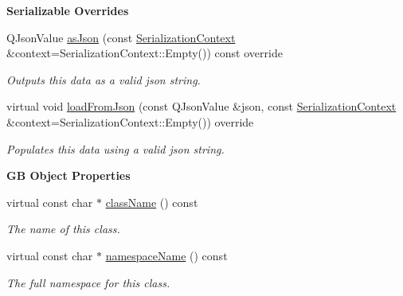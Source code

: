 \begin{Indent}\textbf{ Serializable Overrides}\par
\begin{DoxyCompactItemize}
\item 
\mbox{\label{classrev_1_1_material_af5b9c213b19fdae0e9d5223988ddbd7a}} 
Q\+Json\+Value \mbox{\hyperlink{classrev_1_1_material_af5b9c213b19fdae0e9d5223988ddbd7a}{as\+Json}} (const \mbox{\hyperlink{structrev_1_1_serialization_context}{Serialization\+Context}} \&context=Serialization\+Context\+::\+Empty()) const override
\begin{DoxyCompactList}\small\item\em Outputs this data as a valid json string. \end{DoxyCompactList}\item 
\mbox{\label{classrev_1_1_material_a23d4b7c07e8bc9f099489be893adf923}} 
virtual void \mbox{\hyperlink{classrev_1_1_material_a23d4b7c07e8bc9f099489be893adf923}{load\+From\+Json}} (const Q\+Json\+Value \&json, const \mbox{\hyperlink{structrev_1_1_serialization_context}{Serialization\+Context}} \&context=Serialization\+Context\+::\+Empty()) override
\begin{DoxyCompactList}\small\item\em Populates this data using a valid json string. \end{DoxyCompactList}\end{DoxyCompactItemize}
\end{Indent}
\begin{Indent}\textbf{ GB Object Properties}\par
\begin{DoxyCompactItemize}
\item 
virtual const char $\ast$ \mbox{\hyperlink{classrev_1_1_material_a353022875d44b057bf6de6c3c95fd5b9}{class\+Name}} () const
\begin{DoxyCompactList}\small\item\em The name of this class. \end{DoxyCompactList}\item 
virtual const char $\ast$ \mbox{\hyperlink{classrev_1_1_material_abfa4020a52b5d7c82cc285f58a1fb0c5}{namespace\+Name}} () const
\begin{DoxyCompactList}\small\item\em The full namespace for this class. \end{DoxyCompactList}\end{DoxyCompactItemize}
\end{Indent}
